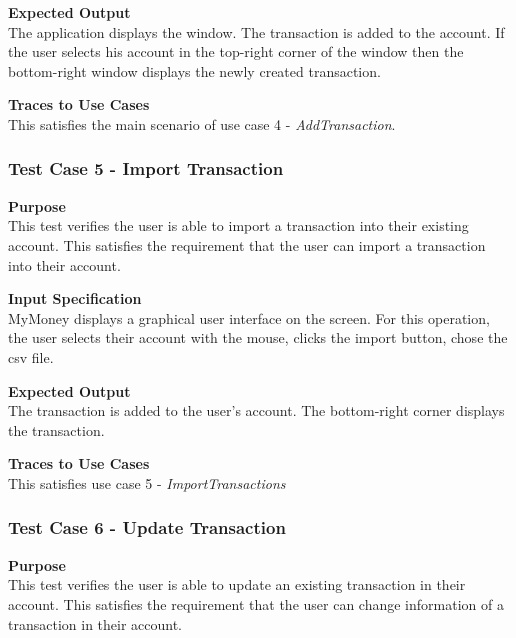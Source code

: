 \documentclass[12pt]{article}
\begin{document}
\noindent
{\bf Expected Output}\\
The application displays the window.    
The transaction is added to the account.
If the user selects his account in the top-right corner of the window then
the bottom-right window displays the newly created transaction.
                                                
\noindent
{\bf Traces to Use Cases}\\
This satisfies the main scenario of use case 4 - \textit{AddTransaction}.

\clearpage %


\subsubsection{Test Case 5 - Import Transaction} \label{TC-5}

\noindent
{\bf Purpose}\\
This test verifies the user is able to import a transaction into their existing account.
This satisfies the requirement that the user can import a transaction into their account.
                                                        

\noindent
{\bf Input Specification}\\
MyMoney displays a graphical user interface on the screen.
For this operation, the user selects their account with the mouse,
clicks the import button, chose the csv file.
                                                          

\noindent
{\bf Expected Output}\\
The transaction is added to the user's account.
The bottom-right corner displays the transaction.


\noindent
{\bf Traces to Use Cases}\\
This satisfies use case 5 - \textit{ImportTransactions}


\subsubsection{Test Case 6 - Update Transaction} \label{TC-6}
\noindent
{\bf Purpose}\\
This test verifies the user is able to update an existing transaction in their account.
This satisfies the requirement that the user can change information of a transaction in their account.
                                                        
\end{document}
